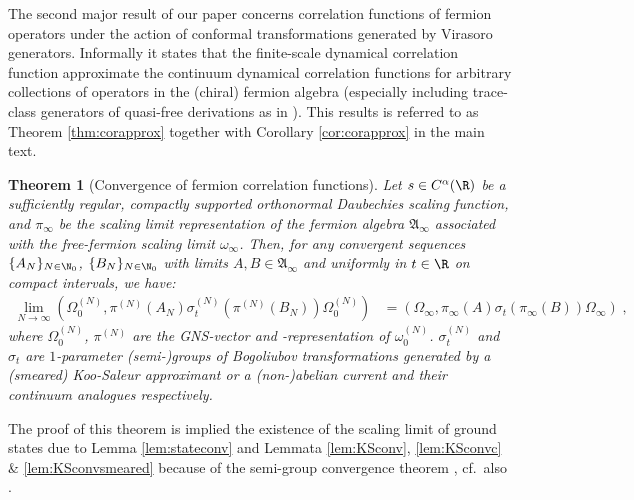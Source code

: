 \documentclass[a4paper, 11pt]{article}
\newcommand{\fA}{\mathfrak{A}}\newcommand{\cA}{\mathcal{A}}\newcommand{\dA}{\mathds{A}}\newcommand{\sA}{\mathscr{A}}
\DeclareMathOperator{\1}{\mathds{1}}
\newtheorem{letterthm}{Theorem}
\begin{document}
The second major result of our paper concerns correlation functions of fermion operators under the action of conformal transformations generated by Virasoro generators. Informally it states that the finite-scale dynamical correlation function approximate the continuum dynamical correlation functions for arbitrary collections of operators in the (chiral) fermion algebra (especially including trace-class generators of quasi-free derivations as in \cite{WitteveenQuantumCircuitApproximations}). This results is referred to as Theorem \ref{thm:corapprox} together with Corollary \ref{cor:corapprox} in the main text.
\begin{letterthm}[Convergence of fermion correlation functions]
\label{thm:B}
Let $s\in C^{\alpha}(\R)$ be a sufficiently regular, compactly supported orthonormal Daubechies scaling function, and $\pi_{\infty}$ be the scaling limit representation of the fermion algebra $\fA_{\infty}$ associated with the free-fermion scaling limit $\omega_{\infty}$. Then, for any convergent sequences $\{A_{N}\}_{N\in\N_{0}}$, $\{B_{N}\}_{N\in\N_{0}}$ with limits $A, B\in\fA_{\infty}$ and uniformly in $t\in\R$ on compact intervals, we have:
\begin{align*}
\lim_{N\rightarrow\infty}(\Omega^{(N)}_{0},\pi^{(N)}(A_{N})\sigma^{(N)}_{t}(\pi^{(N)}(B_{N}))\Omega^{(N)}_{0}) & = (\Omega_{\infty},\pi_{\infty}(A)\sigma_{t}(\pi_{\infty}(B))\Omega_{\infty})\;,
\end{align*}
where $\Omega^{(N)}_{0}$, $\pi^{(N)}$ are the GNS-vector and -representation of $\omega^{(N)}_{0}$. $\sigma^{(N)}_{t}$ and $\sigma_{t}$ are $1$-parameter (semi-)groups of Bogoliubov transformations generated by a (smeared) Koo-Saleur approximant or a (non-)abelian current and their continuum analogues respectively.
\end{letterthm}
The proof of this theorem is implied the existence of the scaling limit of ground states due to Lemma \ref{lem:stateconv} and Lemmata \ref{lem:KSconv}, \ref{lem:KSconvc} \& \ref{lem:KSconvsmeared} because of the semi-group convergence theorem \cite[Theorem 2.16, p. 504]{KatoPerturbationTheoryFor}, cf.~also \cite[Theorem 1.8, p. 141]{EngelAShortCourse}.

\bigskip
\end{document}
